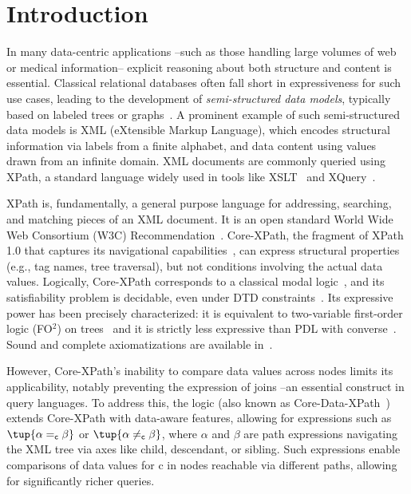 \section{Introduction}
\label{sec:intro}


In many data-centric applications --such as those handling large volumes of web or medical information-- explicit reasoning about both structure and content is essential. Classical relational databases often fall short in expressiveness for such use cases, leading to the development of \emph{semi-structured data models}, typically based on labeled trees or graphs~\cite{Bune:semi97,Abit:data99}. A prominent example of such semi-structured data models is XML (eXtensible Markup Language), which encodes structural information via labels from a finite alphabet, and data content using values drawn from an infinite domain. XML documents are commonly queried using XPath, a standard language widely used in tools like XSLT~\cite{xslt:w3c} and XQuery~\cite{xquery:w3c}.  

XPath is, fundamentally, a general purpose language for
addressing, searching, and matching pieces of an XML document. It is an open standard
World Wide Web Consortium (W3C) Recommendation~\cite{xpath:w3c}.
Core-XPath, the fragment of XPath 1.0 that captures its navigational capabilities~\cite{GKP05}, can express structural properties (e.g., tag names, tree traversal), but not conditions involving the actual data values. Logically, Core-XPath corresponds to a classical modal logic~\cite{blackburn2001modal,blackburn06}, and its satisfiability problem is decidable, even under DTD constraints~\cite{M04,BFG08}. Its expressive power has been precisely characterized: it is equivalent to two-variable first-order logic (FO$^2$) on trees~\cite{MdR05} and it is strictly less expressive than PDL with converse~\cite{BK08}. Sound and complete axiomatizations are available in~\cite{CateM09,cateLM10}.

However, Core-XPath’s inability to compare data values across nodes limits its applicability, notably preventing the expression of joins --an essential construct in query languages. To address this, the logic \xpathd (also known as Core-Data-XPath~\cite{BojanczykMSS09}) extends Core-XPath with data-aware features, allowing for expressions such as $\tup{\alpha =_{\textsf{c}} \beta}$ or $\tup{\alpha \neq_{\textsf{c}} \beta}$, where $\alpha$ and $\beta$ are path expressions navigating the XML tree via axes like child, descendant, or sibling. Such expressions enable comparisons of data values for \textsf{c} in nodes reachable via different paths, allowing for significantly richer queries.

